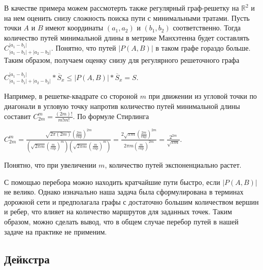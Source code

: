 \documentclass[12pt, a4paper]{article}
\begin{document}
В качестве примера можем рассмотерть также регулярный граф-решетку на $\mathbb {R}^2$ и на нем оценить снизу сложность поиска пути с минимальными тратами. Пусть точки $A$ и $B$ имеют координаты $(a_1, a_2)$ и $(b_1, b_2)$ соответственно. Тогда количество путей минимальной длины в метрике Манхэтенна будет составлять $C^{|a_1-b_1|}_{|a_1-b_1| + |a_2-b_2|}$. Понятно, что путей $|P(A,B)|$ в таком графе гораздо больше. Таким образом, получаем оценку снизу для регулярного решеточного графа

\begin{center}
	$C^{|a_1-b_1|}_{|a_1-b_1| + |a_2-b_2|} * \overline S_x  \leq  \vert P(A,B) \vert * \overline S_x = S$.
\end{center}

Например, в решетке-квадрате со стороной $m$ при движении из угловой точки по диагонали в угловую точку напротив количество путей минимальной длины составит $C^m_{2m} = \frac{(2m)!}{m!m!} $. По формуле Стирлинга
\begin{center}
 $ C^m_{2m} = \frac{\sqrt{2\pi(2m)} \left( \frac{2m}{\exp} \right)^{2m}}{\left(\sqrt{2\pi m} \left( \frac{m}{\exp} \right)^m \right)  \left(\sqrt{2\pi m} \left( \frac{m}{\exp} \right)^m \right)} = \frac{2\sqrt{\pi m} \left( \frac{2m}{\exp} \right)^{2m}}{2\pi m \left( \frac{m}{\exp} \right)^{2m}} = \frac{2^{2m}}{\sqrt{\pi m}}$.
\end{center}
Понятно, что при увеличении $m$, количество путей экспоненциально растет.

С помощью перебора можно находить кратчайшие пути быстро, если $|P(A,B)|$ не велико. Однако изначально наша задача была сформулирована в терминах дорожной сети и предполагала графы с достаточно большим количеством вершин и ребер, что влияет на количество маршрутов для заданных точек. Таким образом, можно сделать вывод, что в общем случае перебор путей в нашей задаче на практике не применим.

\newpage
\subsection{Дейкстра}
\end{document}
